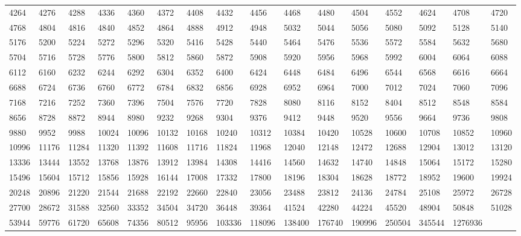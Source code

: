 \begin{longtable}{*{16}{l}}
4264& 4276& 4288& 4336& 4360& 4372& 4408& 4432& 4456& 4468& 4480& 4504& 4552& 4624& 4708& 4720\\
4768& 4804& 4816& 4840& 4852& 4864& 4888& 4912& 4948& 5032& 5044& 5056& 5080& 5092& 5128& 5140\\
5176& 5200& 5224& 5272& 5296& 5320& 5416& 5428& 5440& 5464& 5476& 5536& 5572& 5584& 5632& 5680\\
5704& 5716& 5728& 5776& 5800& 5812& 5860& 5872& 5908& 5920& 5956& 5968& 5992& 6004& 6064& 6088\\
6112& 6160& 6232& 6244& 6292& 6304& 6352& 6400& 6424& 6448& 6484& 6496& 6544& 6568& 6616& 6664\\
6688& 6724& 6736& 6760& 6772& 6784& 6832& 6856& 6928& 6952& 6964& 7000& 7012& 7024& 7060& 7096\\
7168& 7216& 7252& 7360& 7396& 7504& 7576& 7720& 7828& 8080& 8116& 8152& 8404& 8512& 8548& 8584\\
8656& 8728& 8872& 8944& 8980& 9232& 9268& 9304& 9376& 9412& 9448& 9520& 9556& 9664& 9736& 9808\\
9880& 9952& 9988& 10024& 10096& 10132& 10168& 10240& 10312& 10384& 10420& 10528& 10600& 10708& 10852& 10960\\
10996& 11176& 11284& 11320& 11392& 11608& 11716& 11824& 11968& 12040& 12148& 12472& 12688& 12904& 13012& 13120\\
13336& 13444& 13552& 13768& 13876& 13912& 13984& 14308& 14416& 14560& 14632& 14740& 14848& 15064& 15172& 15280\\
15496& 15604& 15712& 15856& 15928& 16144& 17008& 17332& 17800& 18196& 18304& 18628& 18772& 18952& 19600& 19924\\
20248& 20896& 21220& 21544& 21688& 22192& 22660& 22840& 23056& 23488& 23812& 24136& 24784& 25108& 25972& 26728\\
27700& 28672& 31588& 32560& 33352& 34504& 34720& 36448& 39364& 41524& 42280& 44224& 45520& 48904& 50848& 51028\\
53944& 59776& 61720& 65608& 74356& 80512& 95956& 103336& 118096& 138400& 176740& 190996& 250504& 345544& 1276936& \\
\bottomrule\end{longtable}
